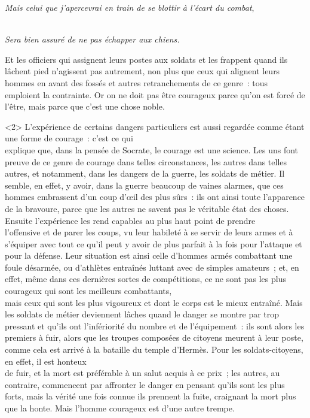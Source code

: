 \documentclass[french,twoside]{book} %
\begin{document}
{\itshape Mais celui que j’apercevrai en train de se blottir à l’écart du combat}, \par
 \\
 {\itshape Sera bien assuré de ne pas échapper aux chiens.} \par
Et les officiers qui assignent leurs postes aux soldats et les frappent quand ils lâchent pied n’agissent pas autrement, non  plus que ceux qui alignent leurs hommes en avant des fossés et autres retranchements de ce genre : tous emploient la contrainte. Or on ne doit pas être courageux parce qu’on est forcé de l’être, mais parce que c’est une chose noble.\par
<2> L’expérience de certains dangers particuliers est aussi regardée comme étant une forme de courage : c’est ce qui \\
explique que, dans la pensée de Socrate, le courage est une science. Les uns font preuve de ce genre de courage dans telles circonstances, les autres dans telles autres, et notamment, dans les dangers de la guerre, les soldats de métier. Il semble, en effet, y avoir, dans la guerre beaucoup de vaines alarmes, que ces hommes embrassent d’un coup d’œil des plus sûrs : ils ont ainsi toute l’apparence de la bravoure, parce que les autres ne savent pas le véritable état des choses. Ensuite l’expérience les rend capables au plus haut point de prendre \\
l’offensive et de parer les coups, vu leur habileté à se servir de leurs armes et à s’équiper avec tout ce qu’il peut y avoir de plus parfait à la fois pour l’attaque et pour la défense. Leur situation est ainsi celle d’hommes armés combattant une foule désarmée, ou d’athlètes entraînés luttant avec de simples amateurs ; et, en effet, même dans ces dernières sortes de compétitions, ce ne sont pas les plus courageux qui sont les meilleurs combattants, \\
mais ceux qui sont les plus vigoureux et dont le corps est le mieux entraîné. Mais les soldats de métier deviennent lâches quand le danger se montre par trop pressant et qu’ils ont l’infériorité du nombre et de l’équipement : ils sont alors les premiers à fuir, alors que les troupes composées de citoyens meurent à leur poste, comme cela est arrivé à la bataille du temple d’Hermès. Pour les soldats-citoyens, en effet, il est honteux \\
de fuir, et la mort est préférable à un salut acquis à ce prix ; les autres, au contraire, commencent par affronter le danger en pensant qu’ils sont les plus forts, mais la vérité une fois connue ils prennent la fuite, craignant la mort plus que la honte. Mais l’homme courageux est d’une autre trempe.\par
\end{document}
